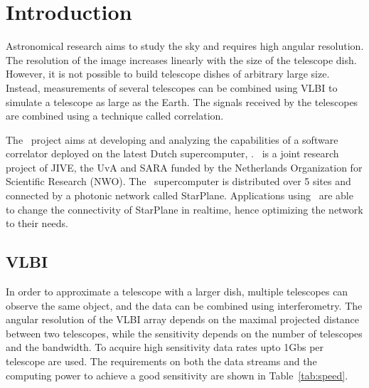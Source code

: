 \section{Introduction}

Astronomical research aims to study the sky and requires high angular
resolution. The resolution of the image increases linearly with the
size of the telescope dish. However, it is not possible to build
telescope dishes of arbitrary large size.  Instead, measurements of
several telescopes can be combined using VLBI to simulate a telescope
as large as the Earth. The signals received by the telescopes are
combined using a technique called correlation.


The \scarie\ project aims at developing and analyzing the capabilities
of a software correlator deployed on the latest Dutch supercomputer,
. \scarie\ is a joint research project of JIVE, the UvA and SARA
funded by the Netherlands Organization for Scientific Research (NWO).
The \ supercomputer is distributed over 5 sites and connected by
a photonic network called StarPlane. Applications using \ are
able to change the connectivity of StarPlane in realtime, hence
optimizing the network to their needs.


\subsection{VLBI}
In order to approximate a telescope with a larger dish, multiple
telescopes can observe the same object, and the data can be combined
using interferometry. The angular resolution of the VLBI array depends
on the maximal projected distance between two telescopes, while the
sensitivity depends on the number of telescopes and the bandwidth. To
acquire high sensitivity data rates upto 1Gbs per telescope are used.
The requirements on both the data streams and the computing power to
achieve a good sensitivity are shown in Table~\ref{tab:speed}.

